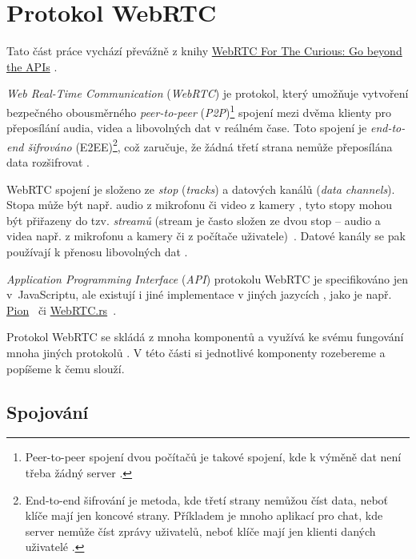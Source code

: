 
\section{Protokol WebRTC}\label{webRTC}

Tato část práce vychází převážně z knihy
\href{https://webrtcforthecurious.com/}{WebRTC For The Curious: Go beyond the
	APIs} \cite{WebRTCForTheCurious}.

\textit{Web Real-Time Communication} (\textit{WebRTC}) je protokol, který
umožňuje vytvoření bezpečného obousměrného \textit{peer-to-peer}
(\textit{P2P})\footnote{Peer-to-peer spojení dvou počítačů je takové spojení,
kde k výměně dat není třeba žádný server \cite{MerriamWebster-PeerToPeer}.}
spojení mezi dvěma klienty pro přeposílání audia, videa a libovolných dat v
reálném čase. Toto spojení je \textit{end-to-end šifrováno}
(E2EE)\footnote{End-to-end šifrování je metoda, kde třetí strany nemůžou číst
data, neboť klíče mají jen koncové strany. Příkladem je mnoho aplikací pro chat,
kde server nemůže číst zprávy uživatelů, neboť klíče mají jen klienti daných
uživatelé \cite{IBM-EndToEndEncryption}.}, což zaručuje, že žádná třetí strana
nemůže přeposílána data rozšifrovat \cite{WebRTCForTheCurious}.

WebRTC spojení je složeno ze \textit{stop} (\textit{tracks}) a datových kanálů
(\textit{data channels}). Stopa může být např. audio z mikrofonu či video z
kamery \cite{MDN-WebRTC-MediaStreamTrack}, tyto stopy mohou být přiřazeny do
tzv. \textit{streamů} (stream je často složen ze dvou stop -- audio a videa
např. z mikrofonu a kamery či z počítače
uživatele)~\cite{MDN-WebRTC-MediaStream}. Datové kanály se pak používají k
přenosu libovolných dat \cite{WebRTCORG-GettingStarted-DataChannels}.

\textit{Application Programming Interface} (\textit{API}) protokolu WebRTC je
specifikováno jen v~JavaScriptu, ale existují i jiné implementace v jiných
jazycích \cite{WebRTCForTheCurious}, jako je např. \href{pion/webrtc: Pure Go
implementation of the WebRTC API}{Pion}~\cite{GitHub-Pion-WebRTC} či
\href{https://github.com/webrtc-rs/webrtc}{WebRTC.rs}~\cite{GitHub-WebRTCRS-WebRTC}.

Protokol WebRTC se skládá z mnoha komponentů a využívá ke svému fungování mnoha
jiných protokolů \cite{WebRTCForTheCurious}. V této části si jednotlivé
komponenty rozebereme a popíšeme k čemu slouží.

\subsection{Spojování}\label{connecting}

